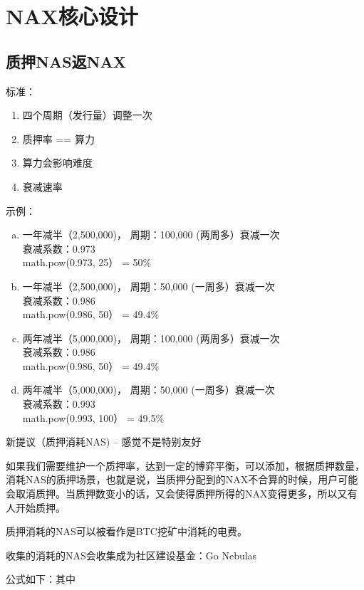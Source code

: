 \section{NAX核心设计}
\subsection{质押NAS返NAX}
标准：
\begin{enumerate}
\item 四个周期（发行量）调整一次
\item 质押率 == 算力
\item 算力会影响难度
\item 衰减速率
\end{enumerate}

示例：
\begin{enumerate}[a.]

\item 一年减半（2,500,000)， 周期：100,000 (两周多）衰减一次\\
衰减系数：0.973\\
math.pow(0.973, 25） = 50\%

\item 一年减半（2,500,000)， 周期：50,000 (一周多）衰减一次\\
衰减系数：0.986\\
math.pow(0.986, 50） = 49.4\%

\item 两年减半（5,000,000)， 周期：100,000 (两周多）衰减一次\\
衰减系数：0.986\\
math.pow(0.986, 50） = 49.4\%

\item 两年减半（5,000,000)， 周期：50,000 (一周多）衰减一次\\
衰减系数：0.993\\
math.pow(0.993, 100） = 49.5\%

\end{enumerate}

新提议（质押消耗NAS) -- 感觉不是特别友好

如果我们需要维护一个质押率，达到一定的博弈平衡，可以添加，根据质押数量，消耗NAS的质押场景，也就是说，当质押分配到的NAX不合算的时候，用户可能会取消质押。当质押数变小的话，又会使得质押所得的NAX变得更多，所以又有人开始质押。

质押消耗的NAS可以被看作是BTC挖矿中消耗的电费。

收集的消耗的NAS会收集成为社区建设基金：Go Nebulas

公式如下：其中

